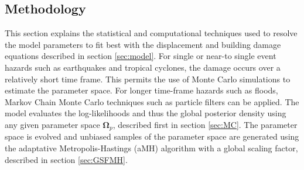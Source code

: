 \documentclass[10pt,a4paper]{article}
\begin{document}
\begin{multicols}{1}
\section{Methodology}\label{sec:methodology}
This section explains the statistical and computational techniques used to resolve the model parameters to fit best with the displacement and building damage equations described in section \ref{sec:model}. For single or near-to single event hazards such as earthquakes and tropical cyclones, the damage occurs over a relatively short time frame. This permits the use of Monte Carlo simulations to estimate the parameter space. For longer time-frame hazards such as floods, Markov Chain Monte Carlo techniques such as particle filters can be applied. The model evaluates the log-likelihoods and thus the global posterior density using any given parameter space $\boldsymbol{\Omega}_p$, described first in section \ref{sec:MC}. The parameter space is evolved and unbiased samples of the parameter space are generated using the adaptative Metropolis-Hastings (aMH) algorithm with a global scaling factor, described in section \ref{sec:GSFMH}.

\end{multicols}
\end{document}

